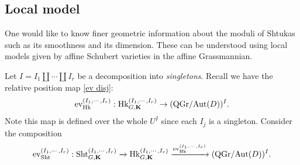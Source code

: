 \documentclass[11pt]{amsart}
\numberwithin{equation}{section}
\theoremstyle{plain}
\theoremstyle{definition}
\def\bK{\mathbf{K}}
\newcommand\ev{\textup{ev}}
\newcommand{\Hk}{\textup{Hk}}
\newcommand\Sht{\textup{Sht}}
\newcommand\Aut{\textup{Aut}}
\newcommand\xr{\xrightarrow}
\newcommand{\QGr}{\mathrm{QGr}}
\begin{document}
\subsection{Local model}
One would like to know finer geometric information about the moduli of Shtukas such as its smoothness and its dimension. These can be understood using local models given by  affine Schubert varieties in the affine Grassmannian.

Let $I=I_{1}\coprod\cdots\coprod I_{r}$ be a decomposition into {\em singletons}. Recall we have the relative position map \eqref{ev disj}:
\begin{equation}\label{ev Hk singleton}
\ev^{(I_{1},\cdots, I_{r})}_{\Hk}: \Hk^{(I_{1},\cdots, I_{r})}_{G,\bK}\to (\QGr/\Aut(D))^{I}.
\end{equation}
Note this map is defined over the whole $U^{I}$ since each $I_{j}$ is a singleton. Consider the composition
\begin{equation}\label{ev Sht singleton}
\ev^{(I_{1},\cdots, I_{r})}_{\Sht}: \Sht^{(I_{1},\cdots, I_{r})}_{G,\bK}\xr{} \Hk^{(I_{1},\cdots, I_{r})}_{G,\bK}\xr{\ev^{(I_{1},\cdots, I_{r})}_{\Hk}} (\QGr/\Aut(D))^{I}.
\end{equation}
\end{document}
